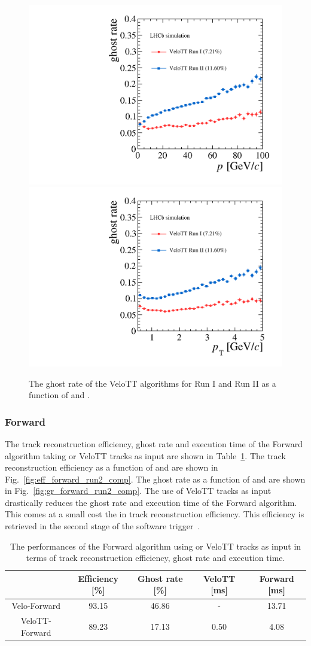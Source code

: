 \begin{figure}[!tb]
  \begin{center}
    \includegraphics[width=0.45\linewidth]{figs/upstream-tracking-run2/VeloTT-gr-p.pdf}
    \includegraphics[width=0.45\linewidth]{figs/upstream-tracking-run2/VeloTT-gr-pt.pdf}
    \caption{The ghost rate of the VeloTT algorithms for Run I and Run II as a function of \ptot and \pt.}
    \label{fig:gr_velott_comp}
  \end{center}
\end{figure}

\subsubsection{Forward}

The track reconstruction efficiency, ghost rate and execution time of the Forward algorithm taking \velo or VeloTT tracks as input are shown in Table~\ref{tab:perf_forward_run2_comp}. The track reconstruction efficiency as a function of \ptot and \pt are shown in Fig.~\ref{fig:eff_forward_run2_comp}. The ghost rate as a function of \ptot and \pt are shown in Fig.~\ref{fig:gr_forward_run2_comp}. The use of VeloTT tracks as input drastically reduces the ghost rate and execution time of the Forward algorithm. This comes at a small cost the in track reconstruction efficiency. This efficiency is retrieved in the second stage of the software trigger~\cite{hlt-runII}.

\begin{table}[!tb]
  \caption{The performances of the Forward algorithm using \velo or VeloTT tracks as input in terms of track reconstruction efficiency, ghost rate and execution time.}
  \label{tab:perf_forward_run2_comp}
  \begin{center}
    \begin{tabular}{c|c|c|c|c}
      & Efficiency [\%] & Ghost rate [\%] & VeloTT [ms] & Forward [ms] \\ 
      \hline
      Velo-Forward  & 93.15  & 46.86  &  -  & 13.71 \\ 
      VeloTT-Forward  & 89.23  & 17.13  &  0.50 & \hphantom{0}4.08 \\
    \end{tabular}
  \end{center}
\end{table}

